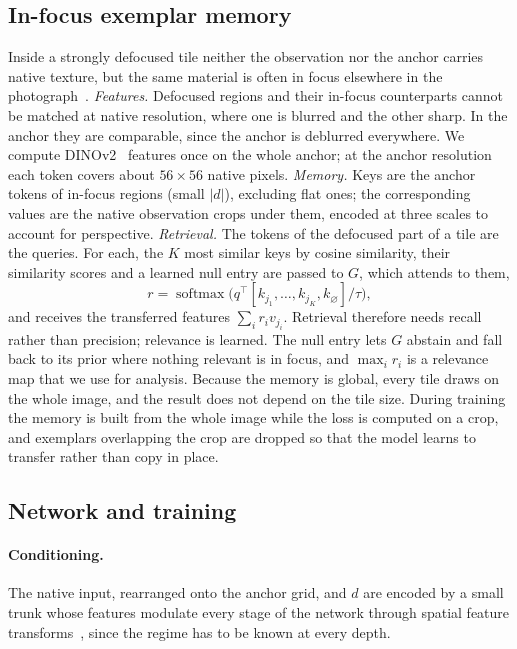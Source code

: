 \subsection{In-focus exemplar memory}
\label{sec:memory}
Inside a strongly defocused tile neither the observation nor the anchor carries native texture, but
the same material is often in focus elsewhere in the photograph~\cite{glasner2009single,zontak2011internal}.
\emph{Features.} Defocused regions and their in-focus counterparts cannot be matched at native
resolution, where one is blurred and the other sharp. In the anchor they are comparable, since the
anchor is deblurred everywhere. We compute DINOv2~\cite{oquab2024dinov2} features once on the whole
anchor; at the anchor resolution each token covers about $56\times56$ native pixels.
\emph{Memory.} Keys are the anchor tokens of in-focus regions (small $|d|$), excluding flat ones; the
corresponding values are the native observation crops under them, encoded at three scales to account
for perspective.
\emph{Retrieval.} The tokens of the defocused part of a tile are the queries. For each, the $K$ most
similar keys by cosine similarity, their similarity scores and a learned null entry are passed to $G$,
which attends to them,
\begin{equation}
  r = \operatorname{softmax}\!\big(q^\top [k_{j_1},\dots,k_{j_K}, k_\varnothing] / \tau\big),
  \label{eq:relevance}
\end{equation}
and receives the transferred features $\sum_i r_i v_{j_i}$. Retrieval therefore needs recall rather
than precision; relevance is learned. The null entry lets $G$ abstain and fall back to its prior where
nothing relevant is in focus, and $\max_i r_i$ is a relevance map that we use for analysis. Because
the memory is global, every tile draws on the whole image, and the result does not depend on the tile
size. During training the memory is built from the whole image while the loss is computed on a crop,
and exemplars overlapping the crop are dropped so that the model learns to transfer rather than copy
in place.

\subsection{Network and training}
\label{sec:variants}
\paragraph{Conditioning.} The native input, rearranged onto the anchor grid, and $d$ are encoded by a small
trunk whose features modulate every stage of the network through spatial feature
transforms~\cite{wang2018sft}, since the regime has to be known at every depth.
